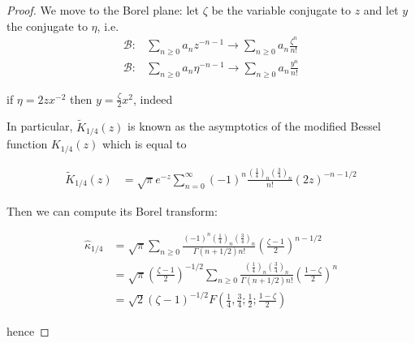 \documentclass{article}
\theoremstyle{definition}
\theoremstyle{plain}
\begin{document}
\begin{proof}
We move to the Borel plane: let $\zeta$ be the variable conjugate to $z$ and let $y$ the conjugate to $\eta$, i.e.
\begin{align*}
\mathcal{B}\colon & \sum_{n\geq 0}a_nz^{-n-1}\to \sum_{n\geq 0}a_n\frac{\zeta^n}{n!}\\
\mathcal{B}\colon&\sum_{n\geq 0}a_n\eta^{-n-1}\to \sum_{n\geq 0}a_n\frac{y^n}{n!}
\end{align*} 

if $\eta=2zx^{-2}$ then $y=\frac{\zeta}{2}x^2$, indeed 



In particular, $\tilde{K}_{1/4}(z)$ is known as the asymptotics of the modified Bessel function $K_{1/4}(z)$ which is equal to 

\begin{align*}
\tilde{K}_{1/4}(z)&=\sqrt{\pi}e^{-z}\sum_{n= 0}^{\infty}(-1)^n\frac{\left(\frac{1}{4}\right)_n\left(\frac{3}{4}\right)_n}{n!}\left(2z\right)^{-n-1/2}
\end{align*}

Then we can compute its Borel transform: 

\begin{align*}
\hat{\kappa}_{1/4}&=\sqrt{\pi}\sum_{n\geq 0}\frac{(-1)^n\left(\frac{1}{4}\right)_n\left(\frac{3}{4}\right)_n}{\Gamma(n+1/2) n!}\left(\frac{\zeta-1}{2}\right)^{n-1/2}\\
&=\sqrt{\pi}\left(\frac{\zeta-1}{2}\right)^{-1/2}\sum_{n\geq 0}\frac{\left(\frac{1}{4}\right)_n\left(\frac{3}{4}\right)_n}{\Gamma(n+1/2) n!}\left(\frac{1-\zeta}{2}\right)^{n}\\
&=\sqrt{2}(\zeta-1)^{-1/2}F\left(\frac{1}{4},\frac{3}{4};\frac{1}{2};\frac{1-\zeta}{2}\right)
\end{align*}

hence 


\end{proof}
\end{document}

